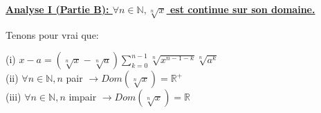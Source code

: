 \documentclass[a4paper,11pt]{report}
\begin{document}
\renewcommand{\labelitemi}{$\cdot$}
\renewcommand{\labelitemii}{$-$}
\begin{Large}\begin{center} 
   \underline{\textbf{Analyse I (Partie B): $\forall n \in \mathbb{N}, \sqrt[n\,]{x}$ est continue sur son domaine.}} 
\end{center}\end{Large}

Tenons pour vrai que:
\begin{center}
(i) $x-a = (\sqrt[n\,]{x}-\sqrt[n\,]{a})\sum\limits_{k=0}^{n-1}{\sqrt[n\,]{x^{n-1-k}}\sqrt[n\,]{a^k}}$\\
(ii) $\forall n \in \mathbb{N}, n$ pair $\rightarrow Dom(\sqrt[n\,]{x}) = \mathbb{R}^+$\\
(iii) $\forall n \in \mathbb{N}, n$ impair $\rightarrow Dom(\sqrt[n\,]{x}) = \mathbb{R}$\\
\end{center}
\end{document}

